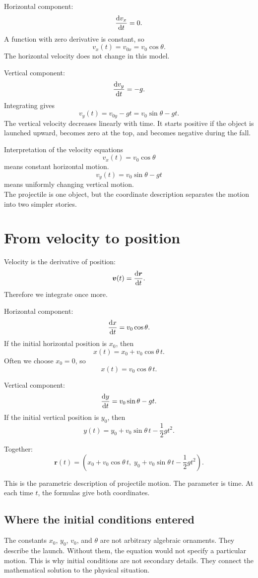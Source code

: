 \documentclass[11pt,a4paper]{article}
\newcommand{\vect}[1]{\boldsymbol{#1}}
\begin{document}
Horizontal component:
\[
\dv{v_x}{t}=0.
\]
A function with zero derivative is constant, so
\[
v_x(t)=v_{0x}=v_0\cos\theta.
\]
The horizontal velocity does not change in this model.

Vertical component:
\[
\dv{v_y}{t}=-g.
\]
Integrating gives
\[
v_y(t)=v_{0y}-gt=v_0\sin\theta-gt.
\]
The vertical velocity decreases linearly with time. It starts positive if the object is launched upward, becomes zero at the top, and becomes negative during the fall.

\begin{methodbox}{Interpretation of the velocity equations}
\[
v_x(t)=v_0\cos\theta
\]
means constant horizontal motion.\\
\[
v_y(t)=v_0\sin\theta-gt
\]
means uniformly changing vertical motion.\\
The projectile is one object, but the coordinate description separates the motion into two simpler stories.
\end{methodbox}

\section{From velocity to position}

Velocity is the derivative of position:
\[
\vect v(t)=\dv{\vect r}{t}.
\]
Therefore we integrate once more.

Horizontal component:
\[
\dv{x}{t}=v_0\cos\theta.
\]
If the initial horizontal position is $x_0$, then
\[
x(t)=x_0+v_0\cos\theta\,t.
\]
Often we choose $x_0=0$, so
\[
x(t)=v_0\cos\theta\,t.
\]

Vertical component:
\[
\dv{y}{t}=v_0\sin\theta-gt.
\]
If the initial vertical position is $y_0$, then
\[
y(t)=y_0+v_0\sin\theta\,t-\frac12gt^2.
\]

Together:
\[
\boxed{\vect r(t)=\left(x_0+v_0\cos\theta\,t,\; y_0+v_0\sin\theta\,t-\frac12gt^2\right).}
\]

This is the parametric description of projectile motion. The parameter is time. At each time $t$, the formulas give both coordinates.

\subsection{Where the initial conditions entered}

The constants $x_0$, $y_0$, $v_0$, and $\theta$ are not arbitrary algebraic ornaments. They describe the launch. Without them, the equation would not specify a particular motion. This is why initial conditions are not secondary details. They connect the mathematical solution to the physical situation.
\end{document}

